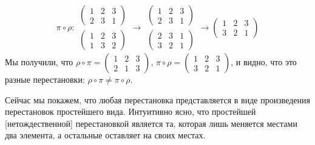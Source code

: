 $$
\pi\circ\rho\colon
\begin{matrix}
\begin{pmatrix}1 & 2 & 3 \\ 2 & 3 & 1\end{pmatrix}
\\
\begin{pmatrix}1 & 2 & 3 \\ 1 & 3 & 2\end{pmatrix}
\end{matrix}
\to
\begin{matrix}
\begin{pmatrix}1 & 2 & 3 \\ 2 & 3 & 1\end{pmatrix}
\\
\begin{pmatrix}2 & 3 & 1 \\ 3 & 2 & 1\end{pmatrix}
\end{matrix}
\to
\begin{pmatrix}1 & 2 & 3 \\ 3 & 2 & 1\end{pmatrix}
$$
Мы получили, что $\rho\circ\pi=\begin{pmatrix}1 & 2 & 3 \\ 2 & 1 &
  3\end{pmatrix}$,
$\pi\circ\rho=\begin{pmatrix}1 & 2 & 3 \\ 3 & 2 & 1\end{pmatrix}$, и
видно, что это разные перестановки: $\rho\circ\pi\neq\pi\circ\rho$.


Сейчас мы покажем, что любая перестановка представляется в виде
произведения перестановок простейшего вида. Интуитивно ясно, что
простейшей [нетождественной] перестановкой является та, которая лишь
меняется местами два элемента, а остальные оставляет на своих местах.

